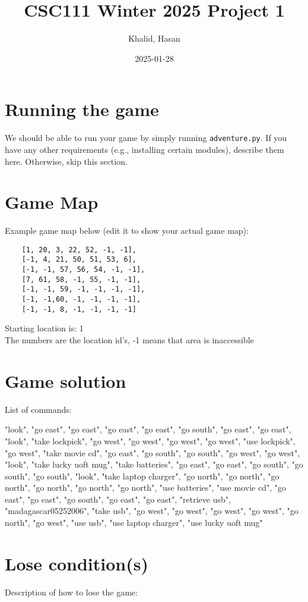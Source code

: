 \documentclass[11pt]{article}
\title{CSC111 Winter 2025 Project 1}
\author{Khalid, Hasan}
\date{2025-01-28}
\begin{document}
\maketitle

\section*{Running the game}
We should be able to run your game by simply running \texttt{adventure.py}. If you have any other requirements (e.g.,
installing certain modules), describe them here. Otherwise, skip this section.

\section*{Game Map}
Example game map below (edit it to show your actual game map):

\begin{verbatim}
    [1, 20, 3, 22, 52, -1, -1],
    [-1, 4, 21, 50, 51, 53, 6],
    [-1, -1, 57, 56, 54, -1, -1],
    [7, 61, 58, -1, 55, -1, -1],
    [-1, -1, 59, -1, -1, -1, -1],
    [-1, -1,60, -1, -1, -1, -1],
    [-1, -1, 8, -1, -1, -1, -1]

\end{verbatim}

Starting location is: 1 \\
The numbers are the location id's, -1 means that area is inaccessible

\section*{Game solution}
List of commands:

"look", "go east", "go east", "go east", "go east", "go south", "go east", "go east", "look",
        "take lockpick", "go west", "go west", "go west", "go west", "use lockpick", "go west",
        "take movie cd", "go east", "go south", "go south", "go west", "go west", "look",
        "take lucky uoft mug", "take batteries", "go east", "go east", "go south", "go south",
        "go south", "look", "take laptop charger", "go north", "go north", "go north", "go north",
        "go north", "go north", "use batteries", "use movie cd", "go east", "go east",
        "go south", "go east", "go east", "retrieve usb", "madagascar05252006", "take usb",
        "go west", "go west", "go west", "go west", "go north", "go west",
        "use usb", "use laptop charger", "use lucky uoft mug"

\section*{Lose condition(s)}
Description of how to lose the game:
\end{document}
